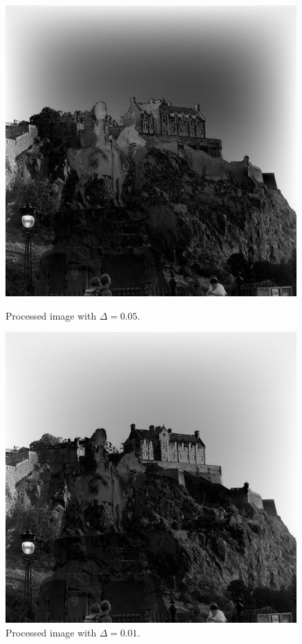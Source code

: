 \documentclass[11pt]{article}
\begin{document}
	\begin{figure}[ht]	
		\centering
		\begin{minipage}[b]{.5\textwidth}
			\centering
			\includegraphics[scale=0.23]{edge768x768_050.jpg}
			\caption{Processed image with $\Delta=0.05$.}\label{pic5}
		\end{minipage}%
		\begin{minipage}[b]{.5\textwidth}
			\centering
			\includegraphics[scale=0.23]{edge768x768_010.jpg}
			\caption{Processed image with $\Delta=0.01$.}\label{pic1}
		\end{minipage}
	\end{figure}
\end{document}
